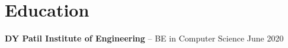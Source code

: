 \documentclass[11pt]{article}       %
\begin{document}

\vspace{-18.5pt}

\section*{Education}
\textbf{DY Patil Institute of Engineering} -- BE in Computer Science \hfill June 2020 \\
\end{document}
